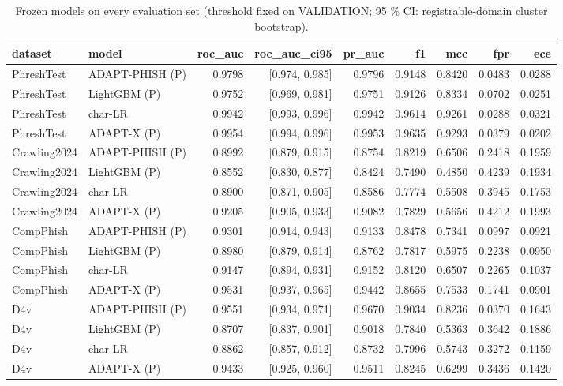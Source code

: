 \begin{table}[t]
\centering
\scriptsize
\caption{Frozen models on every evaluation set (threshold fixed on VALIDATION; 95 \% CI: registrable-domain cluster bootstrap).}
\label{tab:final}
\begin{tabular}{llrrrrrrr}
\toprule
dataset & model & roc\_auc & roc\_auc\_ci95 & pr\_auc & f1 & mcc & fpr & ece \\
\midrule
PhreshTest & ADAPT-PHISH (P) & 0.9798 & [0.974, 0.985] & 0.9796 & 0.9148 & 0.8420 & 0.0483 & 0.0288 \\
PhreshTest & LightGBM (P) & 0.9752 & [0.969, 0.981] & 0.9751 & 0.9126 & 0.8334 & 0.0702 & 0.0251 \\
PhreshTest & char-LR & 0.9942 & [0.993, 0.996] & 0.9942 & 0.9614 & 0.9261 & 0.0288 & 0.0321 \\
PhreshTest & ADAPT-X (P) & 0.9954 & [0.994, 0.996] & 0.9953 & 0.9635 & 0.9293 & 0.0379 & 0.0202 \\
Crawling2024 & ADAPT-PHISH (P) & 0.8992 & [0.879, 0.915] & 0.8754 & 0.8219 & 0.6506 & 0.2418 & 0.1959 \\
Crawling2024 & LightGBM (P) & 0.8552 & [0.830, 0.877] & 0.8424 & 0.7490 & 0.4850 & 0.4239 & 0.1934 \\
Crawling2024 & char-LR & 0.8900 & [0.871, 0.905] & 0.8586 & 0.7774 & 0.5508 & 0.3945 & 0.1753 \\
Crawling2024 & ADAPT-X (P) & 0.9205 & [0.905, 0.933] & 0.9082 & 0.7829 & 0.5656 & 0.4212 & 0.1993 \\
CompPhish & ADAPT-PHISH (P) & 0.9301 & [0.914, 0.943] & 0.9133 & 0.8478 & 0.7341 & 0.0997 & 0.0921 \\
CompPhish & LightGBM (P) & 0.8980 & [0.879, 0.914] & 0.8762 & 0.7817 & 0.5975 & 0.2238 & 0.0950 \\
CompPhish & char-LR & 0.9147 & [0.894, 0.931] & 0.9152 & 0.8120 & 0.6507 & 0.2265 & 0.1037 \\
CompPhish & ADAPT-X (P) & 0.9531 & [0.937, 0.965] & 0.9442 & 0.8655 & 0.7533 & 0.1741 & 0.0901 \\
D4v & ADAPT-PHISH (P) & 0.9551 & [0.934, 0.971] & 0.9670 & 0.9034 & 0.8236 & 0.0370 & 0.1643 \\
D4v & LightGBM (P) & 0.8707 & [0.837, 0.901] & 0.9018 & 0.7840 & 0.5363 & 0.3642 & 0.1886 \\
D4v & char-LR & 0.8862 & [0.857, 0.912] & 0.8732 & 0.7996 & 0.5743 & 0.3272 & 0.1159 \\
D4v & ADAPT-X (P) & 0.9433 & [0.925, 0.960] & 0.9511 & 0.8245 & 0.6299 & 0.3436 & 0.1420 \\

\end{tabular}
\end{table}
